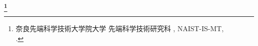 \begin{center}
 \renewcommand{\thefootnote}{\fnsymbol{footnote}}
 \Large\bfseries \jtitle \footnote[1]{奈良先端科学技術大学院大学 先端科学技術研究科 \jdoctitle, NAIST-IS-MT\studentnumber,\\ \jdate.}
 \renewcommand{\thefootnote}{\arabic{footnote}}
\end{center}

\vspace*{1truemm}

\begin{center}
 \large\jauthor
\end{center}

\vspace*{1truemm}

\begin{center}
\end{center}

\vspace*{2truemm}
\par
\jabstract
\vspace*{5truemm}

\begin{flushleft}
\end{flushleft}
\vspace{-2mm}\keywords

